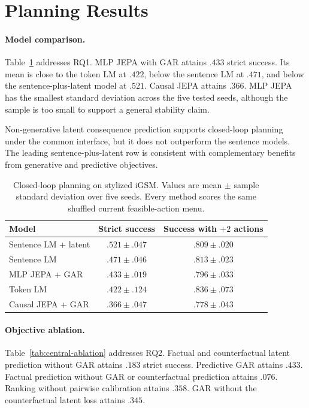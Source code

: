 \section{Planning Results}
\label{sec:results}

\paragraph{Model comparison.}
Table~\ref{tab:headline} addresses RQ1. MLP JEPA with GAR attains $.433$ strict success. Its mean is close to the token LM at $.422$, below the sentence LM at $.471$, and below the sentence-plus-latent model at $.521$. Causal JEPA attains $.366$. MLP JEPA has the smallest standard deviation across the five tested seeds, although the sample is too small to support a general stability claim.

Non-generative latent consequence prediction supports closed-loop planning under the common interface, but it does not outperform the sentence models. The leading sentence-plus-latent row is consistent with complementary benefits from generative and predictive objectives.

\begin{table}[t]
\caption{Closed-loop planning on stylized iGSM. Values are mean $\pm$ sample standard deviation over five seeds. Every method scores the same shuffled current feasible-action menu.}
\label{tab:headline}
\centering
\small
\begin{tabular}{lcc}
\toprule
Model & Strict success & Success with $+2$ actions \\
\midrule
Sentence LM + latent & $\mathbf{.521\pm.047}$ & $.809\pm.020$ \\
Sentence LM & $.471\pm.046$ & $.813\pm.023$ \\
MLP JEPA + GAR & $.433\pm.019$ & $.796\pm.033$ \\
Token LM & $.422\pm.124$ & $\mathbf{.836\pm.073}$ \\
Causal JEPA + GAR & $.366\pm.047$ & $.778\pm.043$ \\
\bottomrule
\end{tabular}
\end{table}

\paragraph{Objective ablation.}
Table~\ref{tab:central-ablation} addresses RQ2. Factual and counterfactual latent prediction without GAR attains $.183$ strict success. Predictive GAR attains $.433$. Factual prediction without GAR or counterfactual prediction attains $.076$. Ranking without pairwise calibration attains $.358$. GAR without the counterfactual latent loss attains $.345$.

